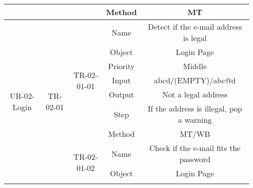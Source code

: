 \documentclass[10pt]{article}
\begin{document}
\begin{table}[htb]
\begin{tabular}{|c|c|c|c|c|}
															 &                            &                                                            & Method   & MT                                                                                             \\ \hline
	\multirow{14}{*}{UR-02-Login}                            & \multirow{14}{*}{TR-02-01} & \multirow{7}{*}{TR-02-01-01}                               & Name     & Detect if the e-mail address is legal                                                          \\ \cline{4-5} 
															 &                            &                                                            & Object   & Login Page                                                                                     \\ \cline{4-5} 
															 &                            &                                                            & Priority & Middle                                                                                         \\ \cline{4-5} 
															 &                            &                                                            & Input    & abcd/(EMPTY)/abc@d                                                                             \\ \cline{4-5} 
															 &                            &                                                            & Output   & Not a legal address                                                                            \\ \cline{4-5} 
															 &                            &                                                            & Step     & If the address is illegal, pop a warning                                                       \\ \cline{4-5} 
															 &                            &                                                            & Method   & MT/WB                                                                                          \\ \cline{3-5} 
															 &                            & \multirow{7}{*}{TR-02-01-02}                               & Name     & Check if the e-mail fits the password                                                          \\ \cline{4-5} 
															 &                            &                                                            & Object   & Login Page                                                                                     \\ \cline{4-5} 

\end{tabular}
\end{table}
\end{document}
